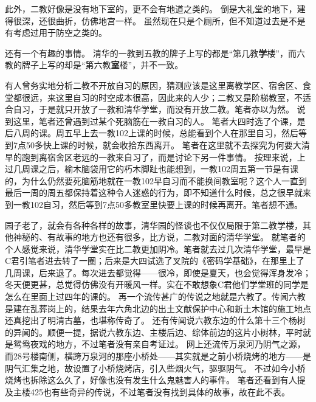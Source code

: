 此外，二教好像是没有地下室的，更不会有地道之类的。
倒是大礼堂的地下，建得很深，还很曲折，仿佛地宫一样。
虽然现在只是个厕所，但不知道过去是不是有考虑过用于防空之类的。

还有一个有趣的事情。
清华的一教到五教的牌子上写的都是“第几教\textbf{学}楼”，而六教的牌子上写的却是“第六教\textbf{室}楼”，并不一致。

有人曾务实地分析二教不开放自习的原因，猜测应该是这里离教学区、宿舍区、食堂都很远，来这里自习的时空成本很高，因此来的人少；二教又是阶梯教室，不适合自习，于是就只开放了一教和清华学堂，而没有开放二教。笔者亦以为然。
说到这里，笔者还曾遇到过某个死脑筋在一教自习的人。
笔者大四时选了个课，是后八周的课。周五早上去一教102上课的时候，总能看到个人在那里自习，然后等到7点50多快上课的时候，就会收拾东西离开。
笔者在这里就不去探究为何要大清早的跑到离宿舍区老远的一教来自习了，而是讨论下另一件事情。
按理来说，上过几周课之后，榆木脑袋用它的朽木脚趾也能想到，一教102周五第一节是有课的，为什么仍然要死脑筋地就在一教102早自习而不能换间教室呢？这个人一直到最后一周的周五都保持着这种令人迷惑的行为，即不知道什么时候，总之很早就来到一教102自习，然后等到7点50多教室里快要上课的时候再离开。笔者想不通。

园子老了，就会有各种各样的故事，清华园的怪谈也不仅仅局限于第二教学楼，其他神秘的、有故事的地方也还有很多，比方说，二教对面的清华学堂。
就笔者的个人感觉来说，清华学堂实在比二教更加阴冷。笔者就去过几次清华学堂，最早是C君引笔者进去转了一圈；后来是大四试选了叉院的《密码学基础》，在那里上了几周课，后来退了。每次进去都觉得——很冷，即使是夏天，也会觉得浑身发冷；冬天便更甚，总觉得仿佛没有开暖风一样。实在不敢想象C君他们学堂班的同学是怎么在里面上过四年的课的。
再一个流传甚广的传说之地就是六教了。传闻六教是建在乱葬岗上的，结果去年六角北边的出土文献保护中心和新土木馆的施工地点还真挖出了明清古墓，也堪称传奇了。
还有传闻说六教东边的什么第十三个杨树的异闻的。顺便一提，据说六教东边、主楼后边、综体前边的这片小树林，平时就是鸳鸯夜戏的地方，不过笔者没有亲自考证过。
网上还流传万泉河乃阴气之源，而28号楼南侧，横跨万泉河的那座小桥处——其实就是之前小桥烧烤的地方——是阴气汇集之地，故设置了小桥烧烤店，引入些烟火气，驱驱阴气。
不过如今小桥烧烤也拆除这么久了，好像也没有发生什么鬼魅害人的事件。
笔者还看到有人提及主楼425也有些奇异的传说，不过笔者没有找到具体的故事，故在此不表。

\nocite{ClassroomBuilding2_Leg1,ClassroomBuilding2_Leg2,ClassroomBuilding2_Info1_THU,ClassroomBuilding2_Info2_Wikipedia,ClassroomBuilding2_Anal1,ClassroomBuilding6_Leg1,WanquanRiver_Leg1}
\putbib
